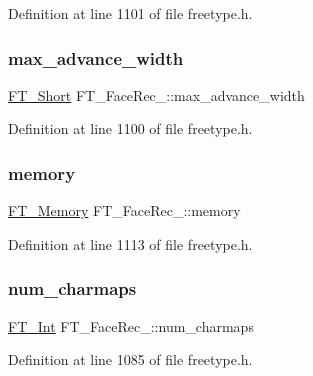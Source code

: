 Definition at line 1101 of file freetype.\+h.

\mbox{\label{struct_f_t___face_rec___ac8c9bd9f9b43ccb81326e7802c3d235d}} 
\subsubsection{\texorpdfstring{max\_advance\_width}{max\_advance\_width}}
{\footnotesize\ttfamily \mbox{\hyperlink{fttypes_8h_aa7279be89046a2563cd3d4d6651fbdcf}{F\+T\+\_\+\+Short}} F\+T\+\_\+\+Face\+Rec\+\_\+\+::max\+\_\+advance\+\_\+width}



Definition at line 1100 of file freetype.\+h.

\mbox{\label{struct_f_t___face_rec___af269b241bfc2f570d485ab03fc0261b2}} 
\subsubsection{\texorpdfstring{memory}{memory}}
{\footnotesize\ttfamily \mbox{\hyperlink{ftsystem_8h_a67ec7ea35cde99a89a65e9f827a9ad3a}{F\+T\+\_\+\+Memory}} F\+T\+\_\+\+Face\+Rec\+\_\+\+::memory}



Definition at line 1113 of file freetype.\+h.

\mbox{\label{struct_f_t___face_rec___a6b953f00e56d508611bb94af85b6d84b}} 
\subsubsection{\texorpdfstring{num\_charmaps}{num\_charmaps}}
{\footnotesize\ttfamily \mbox{\hyperlink{fttypes_8h_af90e5fb0d07e21be9fe6faa33f02484c}{F\+T\+\_\+\+Int}} F\+T\+\_\+\+Face\+Rec\+\_\+\+::num\+\_\+charmaps}



Definition at line 1085 of file freetype.\+h.

\mbox{\label{struct_f_t___face_rec___af28be4cba102baaeb09d8e24b71e88fe}} 
